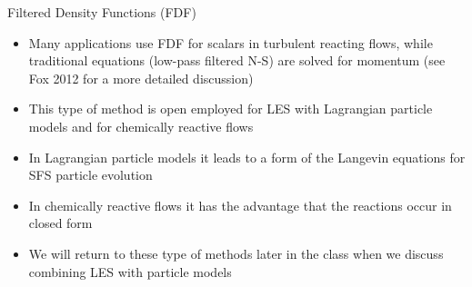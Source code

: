 
\begin{frame}{Filtered Density Functions (FDF)}

\begin{itemize}
	\item Many applications use FDF for scalars in turbulent reacting flows, while traditional equations (low-pass filtered N-S) are solved for momentum (see Fox 2012 for a more detailed discussion)
	\item This type of method is open employed for LES with Lagrangian particle models and for chemically reactive flows
	\item In Lagrangian particle models it leads to a form of the Langevin equations for SFS particle evolution
	\item In chemically reactive flows it has the advantage that the reactions occur in closed form
	\item We will return to these type of methods later in the class when we discuss combining LES with particle models
\end{itemize}

\end{frame}
























































